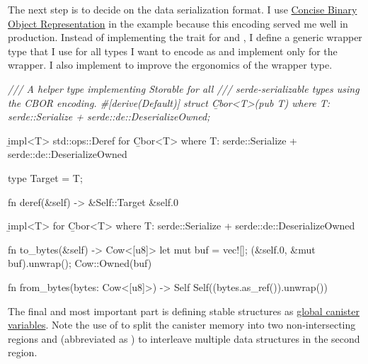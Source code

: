 \documentclass{article}
\begin{document}
The next step is to decide on the data serialization format.
I use \href{https://cbor.io/}{Concise Binary Object Representation} in the example because this encoding served me well in production.
Instead of implementing the \href{#storable-trait}{} trait for  and , I define a generic wrapper type  that I use for all types I want to encode as  and implement \href{#storable-trait}{} only for the wrapper.
I also implement \href{https://doc.rust-lang.org/std/ops/trait.Deref.html}{} to improve the ergonomics of the wrapper type.

\begin{code}[rust]
\em{/// A helper type implementing Storable for all}
\em{/// serde-serializable types using the CBOR encoding.}
#[derive(Default)]
struct \b{Cbor}<T>(pub T)
where T: serde::Serialize + serde::de::DeserializeOwned;

\b{impl}<T> std::ops::Deref for \b{Cbor}<T>
where T: serde::Serialize + serde::de::DeserializeOwned
{
  type Target = T;

  fn deref(&self) -> &Self::Target { &self.0 }
}

\b{impl}<T> \href{#storable-trait}{} for \b{Cbor}<T>
where T: serde::Serialize + serde::de::DeserializeOwned
{
  fn to_bytes(&self) -> Cow<[u8]> {
    let mut buf = vec![];
    \href{https://docs.rs/ciborium/0.2.0/ciborium/ser/fn.into_writer.html}{}(&self.0, &mut buf).unwrap();
    Cow::Owned(buf)
  }

  fn from_bytes(bytes: Cow<[u8]>) -> Self {
    Self(\href{https://docs.rs/ciborium/0.2.0/ciborium/de/fn.from_reader.html}{}(bytes.as_ref()).unwrap())
  }
}
\end{code}

The final and most important part is defining stable structures as \href{/posts/01-effective-rust-canisters.html#use-threadlocal}{global canister variables}.
Note the use of \href{#restricted-memory}{} to split the canister memory into two non-intersecting regions and \href{#memory-manager}{} (abbreviated as ) to interleave multiple data structures in the second region.
\end{document}
